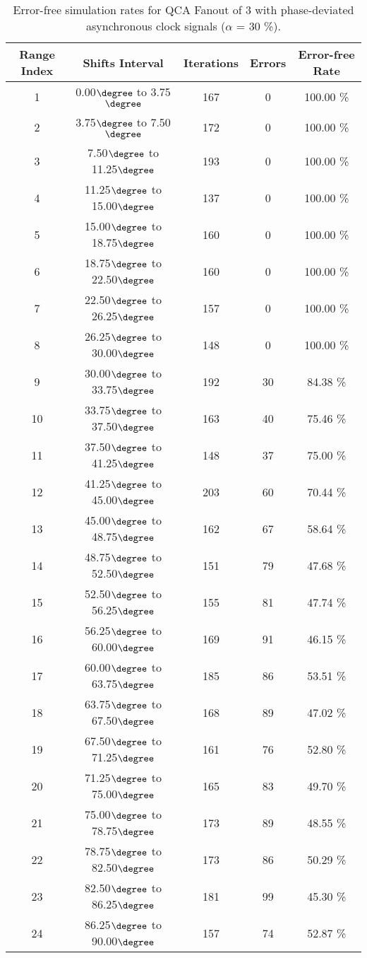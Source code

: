 \flushleft
\begin{table}[h]
\begin{center}
\caption{Error-free simulation rates for QCA Fanout of 3 with phase-deviated asynchronous clock signals ($\alpha$ = 30 \%).}
\begin{tabular}{|c|c|c|c|c|}
\hline
\textbf{Range Index} & \textbf{Shifts Interval} & \textbf{Iterations} & \textbf{Errors} & \textbf{Error-free Rate} \\
\hline
1  &  0.00$\degree$ to  3.75$\degree$ & 167 &  0 & 100.00 \% \\
\hline
2  &  3.75$\degree$ to  7.50$\degree$ & 172 &  0 & 100.00 \% \\
\hline
3  &  7.50$\degree$ to 11.25$\degree$ & 193 &  0 & 100.00 \% \\
\hline
4  & 11.25$\degree$ to 15.00$\degree$ & 137 &  0 & 100.00 \% \\
\hline
5  & 15.00$\degree$ to 18.75$\degree$ & 160 &  0 & 100.00 \% \\
\hline
6  & 18.75$\degree$ to 22.50$\degree$ & 160 &  0 & 100.00 \% \\
\hline
7  & 22.50$\degree$ to 26.25$\degree$ & 157 &  0 & 100.00 \% \\
\hline
8  & 26.25$\degree$ to 30.00$\degree$ & 148 &  0 & 100.00 \% \\
\hline
9  & 30.00$\degree$ to 33.75$\degree$ & 192 & 30 &  84.38 \% \\
\hline
10 & 33.75$\degree$ to 37.50$\degree$ & 163 & 40 &  75.46 \% \\
\hline
11 & 37.50$\degree$ to 41.25$\degree$ & 148 & 37 &  75.00 \% \\
\hline
12 & 41.25$\degree$ to 45.00$\degree$ & 203 & 60 &  70.44 \% \\
\hline
13 & 45.00$\degree$ to 48.75$\degree$ & 162 & 67 &  58.64 \% \\
\hline
14 & 48.75$\degree$ to 52.50$\degree$ & 151 & 79 &  47.68 \% \\
\hline
15 & 52.50$\degree$ to 56.25$\degree$ & 155 & 81 &  47.74 \% \\
\hline
16 & 56.25$\degree$ to 60.00$\degree$ & 169 & 91 &  46.15 \% \\
\hline
17 & 60.00$\degree$ to 63.75$\degree$ & 185 & 86 &  53.51 \% \\
\hline
18 & 63.75$\degree$ to 67.50$\degree$ & 168 & 89 &  47.02 \% \\
\hline
19 & 67.50$\degree$ to 71.25$\degree$ & 161 & 76 &  52.80 \% \\
\hline
20 & 71.25$\degree$ to 75.00$\degree$ & 165 & 83 &  49.70 \% \\
\hline
21 & 75.00$\degree$ to 78.75$\degree$ & 173 & 89 &  48.55 \% \\
\hline
22 & 78.75$\degree$ to 82.50$\degree$ & 173 & 86 &  50.29 \% \\
\hline
23 & 82.50$\degree$ to 86.25$\degree$ & 181 & 99 &  45.30 \% \\
\hline
24 & 86.25$\degree$ to 90.00$\degree$ & 157 & 74 &  52.87 \% \\
\hline


\end{tabular}
\end{center}
\end{table}
